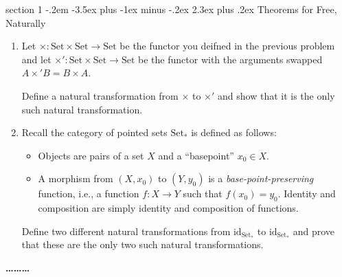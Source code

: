 \documentclass[12pt]{article}
\makeatletter
\theoremstyle{definition}
\newenvironment{problem}{\@startsection
       {section}
       {1}
       {-.2em}
       {-3.5ex plus -1ex minus -.2ex}
       {2.3ex plus .2ex}
       {\pagebreak[3]%
       \large\bf\noindent{Problem }
       }
       }
       {%
       \begin{center}\large\bf \ldots\ldots\ldots\end{center}}
\newcommand{\Set}{\textrm{Set}}
\newcommand{\id}{\textrm{id}}
\makeatother
\begin{document}
\begin{problem}{Theorems for Free, Naturally}
\begin{enumerate}
  \item Let $\times : \Set \times \Set \to \Set$ be the functor you
    deifned in the previous problem and let $\times' : \Set \times
    \Set \to \Set$ be the functor with the arguments swapped $A
    \times' B = B \times A$.

    Define a natural transformation from $\times$ to $\times'$ and
    show that it is the only such natural transformation.

  \item Recall the category of pointed sets $\Set_*$ is defined as follows:
    \begin{itemize}
    \item Objects are pairs of a set $X$ and a ``basepoint'' $x_0 \in X$.
    \item A morphism from $(X,x_0)$ to $(Y, y_0)$ is a
      \emph{base-point-preserving} function, i.e., a function $f : X
      \to Y$ such that $f(x_0) = y_0$. Identity and composition are
      simply identity and composition of functions.
    \end{itemize}

    Define two different natural transformations from
    $\id_{\Set_*}$ to $\id_{\Set_*}$ and prove that these
    are the only two such natural transformations.
  \end{enumerate}
\end{problem}
\newpage

\end{document}
